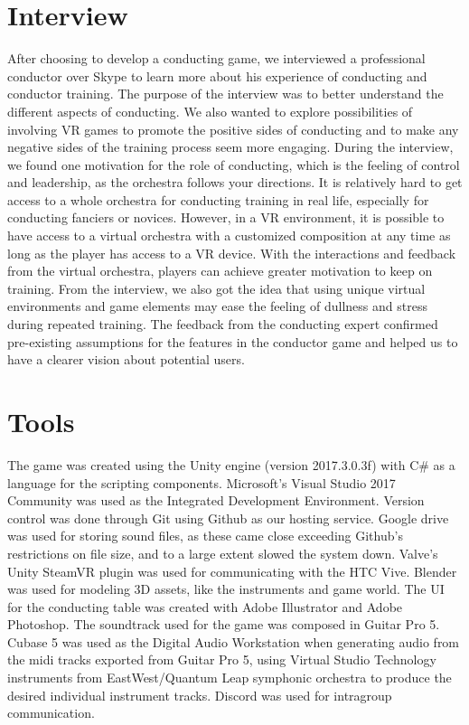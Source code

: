\section{Interview}
After choosing to develop a conducting game, we interviewed a professional conductor over Skype to learn more about his experience of conducting and conductor training. The purpose of the interview was to better understand the different aspects of conducting. We also wanted to explore possibilities of involving VR games to promote the positive sides of conducting and to make any negative sides of the training process seem more engaging. During the interview, we found one motivation for the role of conducting, which is the feeling of control and leadership, as the orchestra follows your directions. It is relatively hard to get access to a whole orchestra for conducting training in real life, especially for conducting fanciers or novices. However, in a VR environment, it is possible to have access to a virtual orchestra with a customized composition at any time as long as the player has access to a VR device. With the interactions and feedback from the virtual orchestra, players can achieve greater motivation to keep on training. From the interview, we also got the idea that using unique virtual environments and game elements may ease the feeling of dullness and stress during repeated training. The feedback from the conducting expert confirmed pre-existing assumptions for the features in the conductor game and helped us to have a clearer vision about potential users.

\section{Tools}
The game was created using the Unity engine (version 2017.3.0.3f) with C\# as a language for the scripting components. Microsoft's Visual Studio 2017 Community was used as the Integrated Development Environment. Version control was done through Git using Github as our hosting service. Google drive was used for storing sound files, as these came close exceeding Github’s restrictions on file size, and to a large extent slowed the system down.
Valve’s Unity SteamVR plugin was used for communicating with the HTC Vive. Blender was used for modeling 3D assets, like the instruments and game world. The UI for the conducting table was created with Adobe Illustrator and Adobe Photoshop. The soundtrack used for the game was composed in Guitar Pro 5. Cubase 5 was used as the Digital Audio Workstation when generating audio from the midi tracks exported from Guitar Pro 5, using Virtual Studio Technology instruments from EastWest/Quantum Leap symphonic orchestra to produce the desired individual instrument tracks. Discord was used for intragroup communication.


